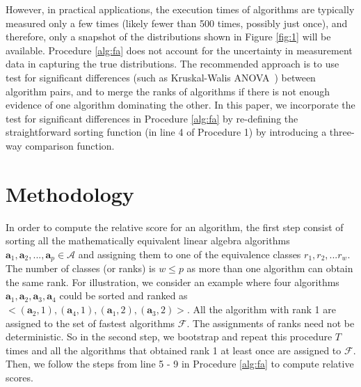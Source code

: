 \documentclass[conference]{IEEEtran}
\begin{document}
However, in practical applications, the execution times of algorithms are typically
measured only a few times (likely fewer than 500 times, possibly just once), and therefore, only a snapshot of the distributions
shown in Figure \ref{fig:1} will be available. Procedure \ref{alg:fa} does not account for the uncertainty in measurement data in capturing the true distributions. 
The recommended approach is to use test for significant differences (such as Kruskal-Walis
ANOVA~\cite{hoefler2015scientific}) between algorithm pairs, and to merge the ranks of algorithms if there is not enough
evidence of one algorithm dominating the other. In this paper, we incorporate the test for significant differences in
Procedure \ref{alg:fa} by re-defining the straightforward sorting function (in line 4 of Procedure 1) by introducing a
three-way comparison function. 

\section{Methodology}
\label{sec:met}

In order to compute the relative score for an algorithm, the first step consist of sorting all the mathematically equivalent linear algebra algorithms $\mathbf{a}_1,\mathbf{a}_2, ..., \mathbf{a}_p \in \mathcal{A}$ and assigning them to one of the equivalence classes $r_1, r_2, ...r_w$. The number of classes (or ranks) is $w \le p$ as more than one algorithm can obtain the same rank. For illustration, we consider an example where four algorithms $\mathbf{a}_1,\mathbf{a}_2, \mathbf{a}_3, \mathbf{a}_4$ could be sorted and ranked as $< (\mathbf{a}_2,1), (\mathbf{a}_4,1), (\mathbf{a}_1,2), (\mathbf{a}_3,2) >$. All the algorithm with rank 1 are assigned to the set of fastest algorithms $\mathcal{F}$. The assignments of ranks need not be deterministic. So in the second step, we bootstrap and repeat this procedure $T$ times and all the algorithms that obtained rank 1 at least once are assigned to $\mathcal{F}$. Then, we follow the steps from line 5 - 9 in Procedure \ref{alg:fa} to compute relative scores. 
\end{document}
